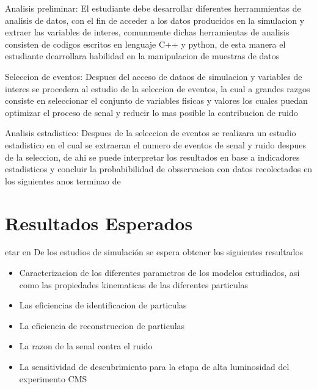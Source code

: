 Analisis preliminar: El estudiante debe desarrollar diferentes herrammientas de analisis de datos, con el fin de acceder a los datos producidos en la simulacion y extraer las variables de interes, comunmente dichas herramientas de analisis consisten de codigos escritos en lenguaje C++ y python, de esta manera el estudiante dearrollara habilidad en la manipulacion de muestras de datos 

Seleccion de eventos: Despues del acceso de dataos de simulacion y variables de interes se procedera al estudio de la seleccion de eventos, la cual a grandes razgos consiste en seleccionar el conjunto de variables fisicas y valores los cuales puedan optimizar el proceso de senal y reducir lo mas posible la contribucion de ruido 

Analisis estadistico: Despues de la seleccion de eventos se realizara un estudio estadistico en el cual se extraeran el numero de eventos de senal y ruido despues de la seleccion, de ahi se puede interpretar los resultados en base a indicadores estadisticos y concluir la probabibilidad de obsservacion con datos recolectados en los siguientes anos terminao de


\chapter{Resultados Esperados} 

etar en De los estudios de simulaci\'on se espera obtener los siguientes resultados

\begin{itemize}
\item Caracterizacion de los diferentes parametros de los modelos estudiados, asi como las propiedades kinematicas de las diferentes particulas 
\item Las eficiencias de identificacion de particulas 
\item La eficiencia de reconstruccion de particulas 
\item La razon de la senal contra el ruido 
\item La sensitividad de descubrimiento para la etapa de alta luminosidad del experimento CMS
\end{itemize}




